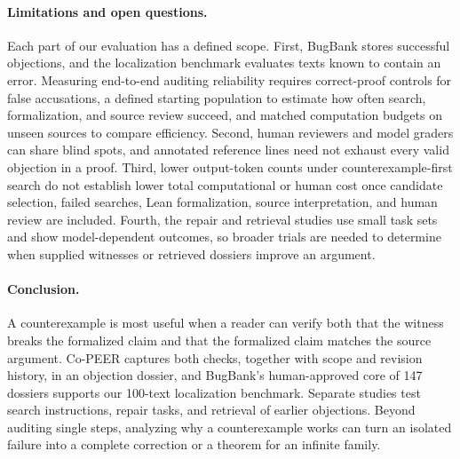 \paragraph{Limitations and open questions.}
Each part of our evaluation has a defined scope. First, BugBank stores successful objections, and the localization benchmark evaluates texts known to contain an error. Measuring end-to-end auditing reliability requires correct-proof controls for false accusations, a defined starting population to estimate how often search, formalization, and source review succeed, and matched computation budgets on unseen sources to compare efficiency. Second, human reviewers and model graders can share blind spots, and annotated reference lines need not exhaust every valid objection in a proof. Third, lower output-token counts under counterexample-first search do not establish lower total computational or human cost once candidate selection, failed searches, Lean formalization, source interpretation, and human review are included. Fourth, the repair and retrieval studies use small task sets and show model-dependent outcomes, so broader trials are needed to determine when supplied witnesses or retrieved dossiers improve an argument.

\paragraph{Conclusion.}
A counterexample is most useful when a reader can verify both that the witness breaks the formalized claim and that the formalized claim matches the source argument. Co-PEER captures both checks, together with scope and revision history, in an objection dossier, and BugBank's human-approved core of 147 dossiers supports our 100-text localization benchmark. Separate studies test search instructions, repair tasks, and retrieval of earlier objections. Beyond auditing single steps, analyzing why a counterexample works can turn an isolated failure into a complete correction or a theorem for an infinite family.
